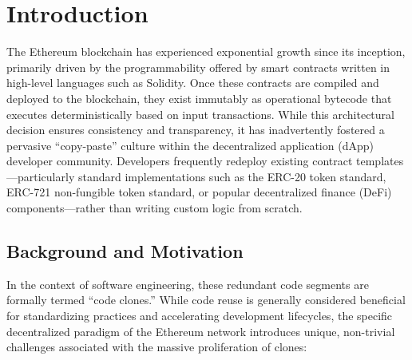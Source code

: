 \documentclass[12pt,a4paper]{article}
\begin{document}
\section{Introduction}
The Ethereum blockchain has experienced exponential growth since its inception, primarily driven by the programmability offered by smart contracts written in high-level languages such as Solidity. Once these contracts are compiled and deployed to the blockchain, they exist immutably as operational bytecode that executes deterministically based on input transactions. While this architectural decision ensures consistency and transparency, it has inadvertently fostered a pervasive ``copy-paste'' culture within the decentralized application (dApp) developer community. Developers frequently redeploy existing contract templates—particularly standard implementations such as the ERC-20 token standard, ERC-721 non-fungible token standard, or popular decentralized finance (DeFi) components—rather than writing custom logic from scratch.

\subsection{Background and Motivation}
In the context of software engineering, these redundant code segments are formally termed ``code clones.'' While code reuse is generally considered beneficial for standardizing practices and accelerating development lifecycles, the specific decentralized paradigm of the Ethereum network introduces unique, non-trivial challenges associated with the massive proliferation of clones:
\end{document}
